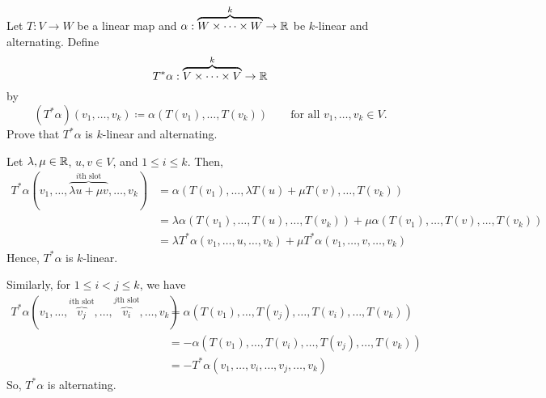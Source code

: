 \documentclass{article}
\begin{document}
\begin{problem}
Let $T : V \to W$ be a linear map and $\alpha : \overbrace{W \times \dots \times W}^{k} \to \mathbb{R}$ be $k$-linear and alternating.
Define
\[
	T^* \alpha : \overbrace{V \times \dots \times V}^{k} \to \mathbb{R}
\]
by
\[
	(T^* \alpha)(v_1, \dots, v_k) \coloneq \alpha (T(v_1), \dots, T(v_k)) \qquad \text{for all $v_1, \dots, v_k \in V$}.
\]
Prove that $T^* \alpha$ is $k$-linear and alternating.
\end{problem}
\begin{solution}
	Let $\lambda, \mu \in \mathbb{R}$, $u, v \in V$, and $1 \le i \le k$.
	Then,
	\begin{align*}
		T^* \alpha (v_1, \dots, \overbrace{\lambda u + \mu v}^{\text{$i$th slot}}, \dots, v_k) & = \alpha (T(v_1), \dots, \lambda T(u) + \mu T(v), \dots, T(v_k))                                                                     \\
		                                                                                       & = \lambda \alpha (T(v_1), \dots, T(u), \dots, T(v_k)) + \mu \alpha (T(v_1), \dots, T(v), \dots, T(v_k)) \tag{$\alpha$ is $k$-linear} \\
		                                                                                       & = \lambda T^* \alpha (v_1, \dots, u, \dots, v_k) + \mu T^* \alpha (v_1, \dots, v, \dots, v_k)
	\end{align*}
	Hence, $T^* \alpha$ is $k$-linear.

	Similarly, for $1 \le i < j \le k$, we have
	\begin{align*}
		T^* \alpha (v_1, \dots, \overbrace{v_j}^{\text{$i$th slot}}, \dots, \overbrace{v_i}^{\text{$j$th slot}}, \dots, v_k) & = \alpha(T(v_1), \dots, T(v_j), \dots, T(v_i), \dots, T(v_k))                                  \\
		                                                                                                                     & = - \alpha (T(v_1), \dots, T(v_i), \dots, T(v_j), \dots, T(v_k)) \tag{$\alpha$ is alternating} \\
		                                                                                                                     & = - T^*\alpha(v_1, \dots, v_i, \dots, v_j, \dots, v_k)
	\end{align*}
	So, $T^* \alpha$ is alternating.
\end{solution}
\end{document}

